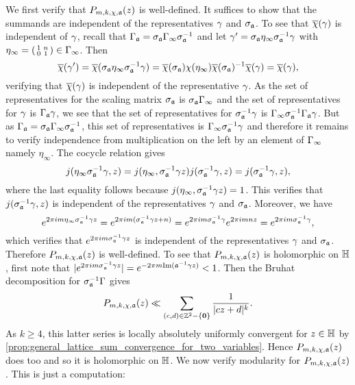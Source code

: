    We first verify that $P_{m,k,\chi,\mathfrak{a}}(z)$ is well-defined. It suffices to show that the summands are independent of the representatives $\gamma$ and $\sigma_{\mathfrak{a}}$. To see that $\overline{\chi}(\gamma)$ is independent of $\gamma$, recall that $\Gamma_{\mathfrak{a}} = \sigma_{\mathfrak{a}}\Gamma_{\infty}\sigma_{\mathfrak{a}}^{-1}$ and let $\gamma' = \sigma_{\mathfrak{a}}\eta_{\infty}\sigma_{\mathfrak{a}}^{-1}\gamma$ with $\eta_{\infty} = \begin{psmallmatrix} 1 & n \\ 0 & 1 \end{psmallmatrix} \in \Gamma_{\infty}$. Then
    \[
      \overline{\chi}(\gamma') = \overline{\chi}(\sigma_{\mathfrak{a}}\eta_{\infty}\sigma_{\mathfrak{a}}^{-1}\gamma) = \overline{\chi}(\sigma_{\mathfrak{a}})\chi(\eta_{\infty})\overline{\chi}(\sigma_{\mathfrak{a}})^{-1}\overline{\chi}(\gamma) = \overline{\chi}(\gamma),
    \]
    verifying that $\overline{\chi}(\gamma)$ is independent of the representative $\gamma$. As the set of representatives for the scaling matrix $\sigma_{\mathfrak{a}}$ is $\sigma_{\mathfrak{a}}\Gamma_{\infty}$ and the set of representatives for $\gamma$ is $\Gamma_{\mathfrak{a}}\gamma$, we see that the set of representatives for $\sigma_{\mathfrak{a}}^{-1}\gamma$ is $\Gamma_{\infty}\sigma_{\mathfrak{a}}^{-1}\Gamma_{\mathfrak{a}}\gamma$. But as $\Gamma_{\mathfrak{a}} = \sigma_{\mathfrak{a}}\Gamma_{\infty}\sigma_{\mathfrak{a}}^{-1}$, this set of representatives is $\Gamma_{\infty}\sigma_{\mathfrak{a}}^{-1}\gamma$ and therefore it remains to verify independence from multiplication on the left by an element of $\Gamma_{\infty}$ namely $\eta_{\infty}$. The cocycle relation gives
    \[
      j(\eta_{\infty}\sigma_{\mathfrak{a}}^{-1}\gamma,z) = j(\eta_{\infty},\sigma_{\mathfrak{a}}^{-1}\gamma z)j(\sigma_{\mathfrak{a}}^{-1}\gamma,z) = j(\sigma_{\mathfrak{a}}^{-1}\gamma,z),
    \]
    where the last equality follows because $j(\eta_{\infty},\sigma_{\mathfrak{a}}^{-1}\gamma z) = 1$. This verifies that $j(\sigma_{\mathfrak{a}}^{-1}\gamma,z)$ is independent of the representatives $\gamma$ and $\sigma_{\mathfrak{a}}$. Moreover, we have
    \[
      e^{2\pi im\eta_{\infty}\sigma_{\mathfrak{a}}^{-1}\gamma z} = e^{2\pi im(\sigma_{\mathfrak{a}}^{-1}\gamma z+n)} = e^{2\pi im\sigma_{\mathfrak{a}}^{-1}\gamma}e^{2\pi imnz} = e^{2\pi im\sigma_{\mathfrak{a}}^{-1}\gamma},
    \]
    which verifies that $e^{2\pi im\sigma_{\mathfrak{a}}^{-1}\gamma z}$ is independent of the representatives $\gamma$ and $\sigma_{\mathfrak{a}}$. Therefore $P_{m,k,\chi,\mathfrak{a}}(z)$ is well-defined. To see that $P_{m,k,\chi,\mathfrak{a}}(z)$ is holomorphic on $\mathbb{H}$, first note that $|e^{2\pi im\sigma_{\mathfrak{a}}^{-1}\gamma z}| = e^{-2\pi m\mathrm{Im}(\mathfrak{a}^{-1}\gamma z)} < 1$. Then the Bruhat decomposition for $\sigma_{\mathfrak{a}}^{-1}\Gamma$ gives
    \[
      P_{m,k,\chi,\mathfrak{a}}(z) \ll \sum_{(c,d) \in \mathbb{Z}^{2}-\{\mathbf{0}\}}\frac{1}{|cz+d|^{k}}.
    \]
    As $k \ge 4$, this latter series is locally absolutely uniformly convergent for $z \in \mathbb{H}$ by \cref{prop:general_lattice_sum_convergence_for_two_variables}. Hence $P_{m,k,\chi,\mathfrak{a}}(z)$ does too and so it is holomorphic on $\mathbb{H}$. We now verify modularity for $P_{m,k,\chi,\mathfrak{a}}(z)$. This is just a computation:
